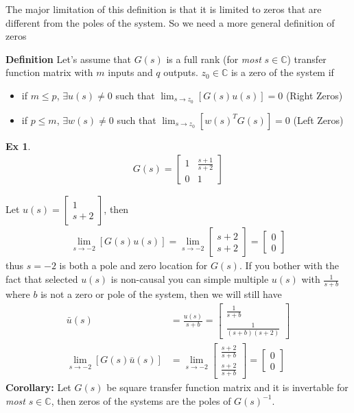 \documentclass[twoside]{article}
\newtheorem{exmp}[theorem]{Ex}
\begin{document}
\vspace{12pt}

The major limitation of this definition is that it is limited to zeros that are different from the poles of the system. So we 
need a more general definition of zeros 

\vspace{12pt}

\textbf{Definition} Let's assume that $G(s)$ is a full rank (for \textit{most} $s \in \mathbb{C}$) transfer function matrix with $m$
inputs and $q$ outputs. $z_0 \in \mathbb{C}$ is a zero of the system if
\begin{itemize}
\item if $m \leq p$, $\exists u(s) \neq 0$  such that $\lim_{s \to z_0} [ G(s) u(s) ] = 0$ (Right Zeros)
\item if $p \leq m$, $\exists w(s) \neq 0$ such that $\lim_{s \to z_0} [ w(s)^T G(s) ] = 0$ (Left Zeros)
\end{itemize}
%
\begin{exmp}
	\begin{align*}
	G(s) = \left[ \begin{array}{ccc} 1 & \frac{s+1}{s+2}  \\  
	0 & 1  \end{array} \right]
	\end{align*}
\end{exmp}

Let $u(s) = \begin{bmatrix} 1 \\ s+2 \end{bmatrix}$, then
%
\begin{align*}
\lim_{s \to -2} [ G(s) u(s) ] = \lim_{s \to -2} \begin{bmatrix} s+2 \\ s+2 \end{bmatrix} = \begin{bmatrix} 0 \\ 0 \end{bmatrix}
\end{align*}
%
thus $s = -2$ is both a pole and zero location for $G(s)$. If you bother with the fact that selected $u(s)$ is non-causal you can simple multiple $u(s)$ with $\frac{1}{s+b}$ where $b$ is not a zero or pole of the system, then we will still have 
%
%
\begin{align*}
\bar{u}(s) &= \frac{u(s)}{s+b} = \begin{bmatrix} \frac{1}{s+b} \\ \frac{1}{(s+b)(s+2)} \end{bmatrix}
\\
\lim_{s \to -2} [ G(s) \bar{u}(s) ] &= \lim_{s \to -2} \begin{bmatrix} \frac{s+2}{s+b} \\ \frac{s+2}{s+b} \end{bmatrix} = \begin{bmatrix} 0 \\ 0 \end{bmatrix}
\end{align*}
%
\textbf{Corollary:} Let $G(s)$ be square transfer function matrix and it is invertable for \textit{most} $s \in \mathbb{C}$, then zeros of the systems
are the poles of $G(s)^{-1}$. 
\end{document}

